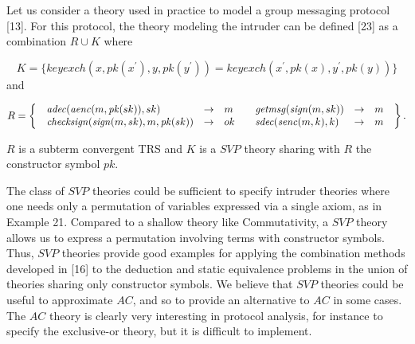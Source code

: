 \documentclass[10pt,a4paper]{amsart}
\begin{document}
Let us consider a theory used in practice to model a group messaging protocol [13]. For this protocol, the theory modeling the intruder can be defined [23] as a combination $R\cup K$ where\par
    \[K=\{\mathit{keyexch}(x,\mathit{pk}(x^{\prime}),y,\mathit{pk}(y^{\prime}))=%
\mathit{keyexch}(x^{\prime},\mathit{pk}(x),y^{\prime},\mathit{pk}(y))\}\]    
and\par
    \[R=\left\{\begin{array}[]{ll}\begin{array}[]{lcl}\mathit{adec}(\mathit{aenc}(m,%
\mathit{pk}(sk)),sk)&\rightarrow&m\\
\mathit{checksign}(\mathit{sign}(m,sk),m,\mathit{pk}(sk))&\rightarrow&ok\end{%
array}&\begin{array}[]{lcl}\mathit{getmsg}(\mathit{sign}(m,sk))&\rightarrow&m%
\\
\mathit{sdec}(\mathit{senc}(m,k),k)&\rightarrow&m\end{array}\end{array}\right\}.\]    
 
 
$R$ is a subterm convergent TRS and $K$ is a $\mathit{SVP}$ theory sharing with $R$ the constructor symbol $\mathit{pk}$.\par
 
 
 
 
The class of $\mathit{SVP}$ theories could be sufficient to specify intruder theories where one needs only a permutation of variables expressed via a single axiom, as in Example 21. Compared to a shallow theory like Commutativity, a $\mathit{SVP}$ theory allows us to express a permutation involving terms with constructor symbols. Thus, $\mathit{SVP}$ theories provide good examples for applying the combination methods developed in [16] to the deduction and static equivalence problems in the union of theories sharing only constructor symbols. We believe that $\mathit{SVP}$ theories could be useful to approximate $AC$, and so to provide an alternative to $AC$ in some cases. The $AC$ theory is clearly very interesting in protocol analysis, for instance to specify the exclusive-or theory, but it is difficult to implement.\par
 
 
\end{document}
